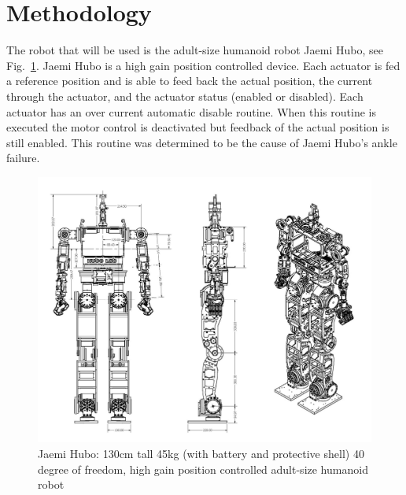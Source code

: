 \section{Methodology}

The robot that will be used is the adult-size humanoid robot Jaemi Hubo, see Fig.~\ref{fig:huboSch}.  Jaemi Hubo is a high gain position controlled device.  Each actuator is fed a reference position and is able to feed back the actual position, the current through the actuator, and the actuator status (enabled or disabled).  Each actuator has an over current automatic disable routine.  When this routine is executed the motor control is deactivated but feedback of the actual position is still enabled.  This routine was determined to be the cause of Jaemi Hubo's ankle failure.

\begin{figure}[thpb]
  \centering
\includegraphics[width=1.0\columnwidth]{./pix/huboSch.png}
  \caption{Jaemi Hubo: 130cm tall 45kg (with battery and protective shell) 40 degree of freedom, high gain position controlled adult-size humanoid robot }
  \label{fig:huboSch}
\end{figure}